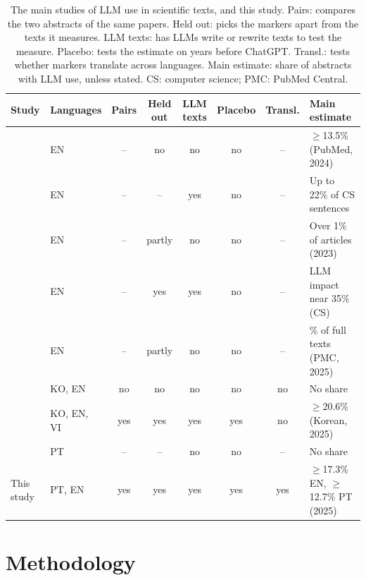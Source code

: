 \documentclass[12pt]{article}
\begin{document}
\begin{table}[t]
  \centering
  \caption{The main studies of LLM use in scientific texts, and this study. Pairs: compares the two
    abstracts of the same papers. Held out: picks the markers apart from the texts it measures. LLM
    texts: has LLMs write or rewrite texts to test the measure. Placebo: tests the estimate on years
    before ChatGPT. Transl.: tests whether markers translate across languages. Main estimate: share
    of abstracts with LLM use, unless stated. CS: computer science; PMC: PubMed Central.}
  \label{tab:related}
  \footnotesize
  \setlength{\tabcolsep}{1.9pt}
  \begin{tabular}{>{\raggedright\arraybackslash}p{3.55cm}>{\raggedright\arraybackslash}p{1.6cm}ccccc>{\raggedright\arraybackslash}p{4.4cm}}
    \toprule
    Study & Languages & Pairs & \shortstack{Held\\out} & \shortstack{LLM\\texts} & Placebo
      & Transl. & Main estimate \\
    \midrule
    \cite{kobak2025delving} & EN & -- & no & no & no & -- & $\ge$13.5\% (PubMed, 2024) \\
    \cite{liang2025quantifying} & EN & -- & -- & yes & no & -- & Up to 22\% of CS sentences \\
    \cite{gray2024contamination} & EN & -- & partly & no & no & -- & Over 1\% of articles (2023) \\
    \cite{geng2024transforming} & EN & -- & yes & yes & no & -- & LLM impact near 35\% (CS) \\
    \cite{holzwarth2026most} & EN & -- & partly & no & no & -- & 77\% of full texts (PMC, 2025) \\
    \cite{koo2026lexical} & KO, EN & no & no & no & no & no & No share \\
    \cite{lee2026korean} & KO, EN, VI & yes & yes & yes & yes & no & $\ge$20.6\% (Korean, 2025) \\
    \cite{lobo2026evolucao} & PT & -- & -- & no & no & -- & No share \\
    This study & PT, EN & yes & yes & yes & yes & yes & $\ge$17.3\% EN, $\ge$12.7\% PT (2025) \\
    \bottomrule
  \end{tabular}
\end{table}

\section{Methodology}
\label{sec:method}
\end{document}
